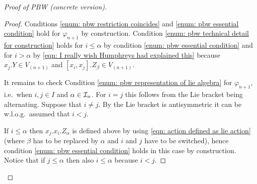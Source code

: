 \begin{proof}[Proof of PBW (concrete version)]
\begin{proof}
  Conditions \ref{enum: pbw restriction coincides} and \ref{enum: pbw essential condition} hold for $\varphi_{n+1}$ by construction. Condition \ref{enum: pbw technical detail for construction} holds for $i \leq \alpha$ by condition \ref{enum: pbw essential condition} and for $i > \alpha$ by \eqref{eqn: I really wish Humphreys had explained this} because $x_j.Y \in V_{(n+1)}$ and $[x_i, x_j].Z_\beta \in V_{(n+1)}$.
  
  It remains to check Condition \ref{enum: pbw representation of lie algebra} for $\varphi_{n+1}$, i.e.\ when $i,j \in I$ and $\alpha \in \mathcal{I}_n$. For $i = j$ this follows from the Lie bracket being alternating. Suppose that $i \neq j$. By the Lie bracket is antisymmetric it can be w.l.o.g.\ assumed that $i < j$.
  
  If $i \leq \alpha$ then $x_j.x_i.Z_\alpha$ is defined above by using \eqref{eqn: action defined as lie action} (where $\beta$ has to be replaced by $\alpha$ and $i$ and $j$ have to be switched), hence condition \ref{enum: pbw essential condition} holds in this case by construction. Notice that if $j \leq \alpha$ then also $i \leq \alpha$ because $i < j$.
  

\end{proof}
\end{proof}
